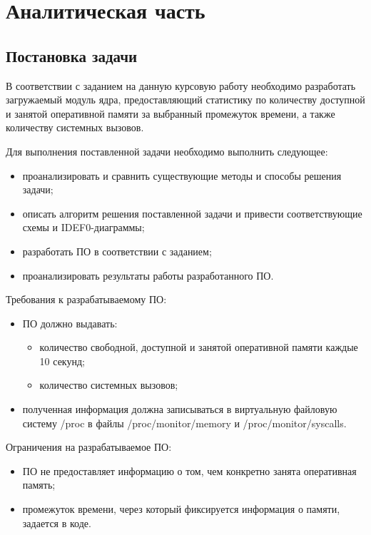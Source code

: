 \section{Аналитическая часть}

\subsection{Постановка задачи}

В соответствии с заданием на данную курсовую работу необходимо разработать загружаемый модуль ядра, предоставляющий статистику по количеству доступной и занятой оперативной памяти за выбранный промежуток времени, а также количеству системных вызовов.

Для выполнения поставленной задачи необходимо выполнить следующее:

\begin{itemize}
	\item проанализировать и сравнить существующие методы и способы решения задачи;
	\item описать алгоритм решения поставленной задачи и привести соответствующие схемы и IDEF0-диаграммы;
	\item разработать ПО в соответствии с заданием;
	\item проанализировать результаты работы разработанного ПО.
\end{itemize}

Требования к разрабатываемому ПО:
\begin{itemize}
	\item ПО должно выдавать:
	
	\begin{itemize}
		\item количество свободной, доступной и занятой оперативной памяти каждые 10 секунд;
		
		\item количество системных вызовов;
	\end{itemize}
	
	\item полученная информация должна записываться в виртуальную файловую систему /proc в файлы /proc/monitor/memory и /proc/monitor/syscalls.
\end{itemize}

Ограничения на разрабатываемое ПО:
\begin{itemize}
	\item ПО не предоставляет информацию о том, чем конкретно занята оперативная память;
	
	\item промежуток времени, через который фиксируется информация о памяти, задается в коде.
\end{itemize}

